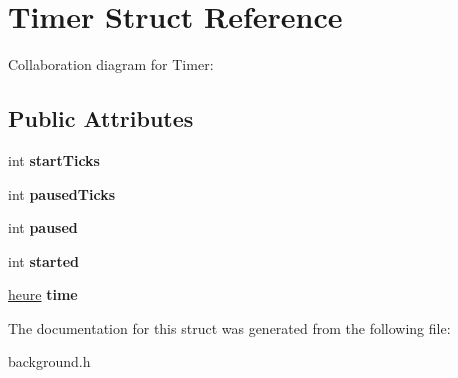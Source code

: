 \hypertarget{structTimer}{}\section{Timer Struct Reference}
\label{structTimer}


Collaboration diagram for Timer\+:
\subsection*{Public Attributes}
\begin{DoxyCompactItemize}
\item 
\mbox{\label{structTimer_ad6e980d932698bb8fd82498e6c47696c}} 
int {\bfseries start\+Ticks}
\item 
\mbox{\label{structTimer_a656a26aa06175d577077ac6181e772fd}} 
int {\bfseries paused\+Ticks}
\item 
\mbox{\label{structTimer_a7fb9c61c8c6b3277fa1a33a054987704}} 
int {\bfseries paused}
\item 
\mbox{\label{structTimer_ae61fe29f9f0ed5eb7eed278b3dee29f0}} 
int {\bfseries started}
\item 
\mbox{\label{structTimer_ac7f0cfc2a6dadae0951dd728c60eba69}} 
\hyperlink{structHeure}{heure} {\bfseries time}
\end{DoxyCompactItemize}


The documentation for this struct was generated from the following file\+:\begin{DoxyCompactItemize}
\item 
background.\+h\end{DoxyCompactItemize}

